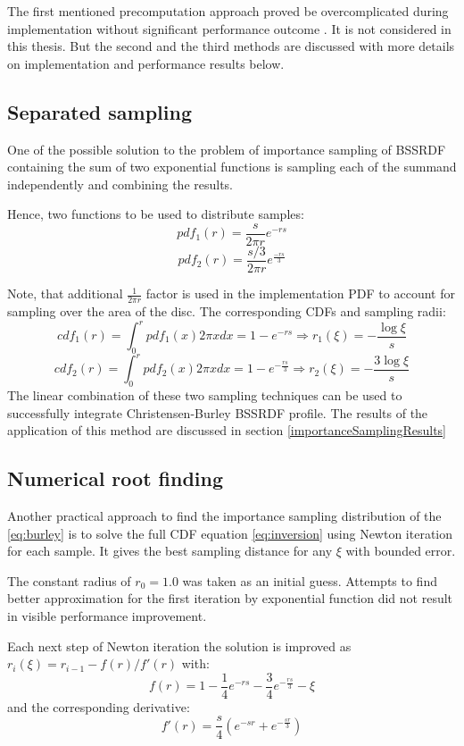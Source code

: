 The first mentioned precomputation approach proved be overcomplicated during implementation
without significant performance outcome \cite{Christensen:2015:ARP:2775280.2792555}. It is not
considered in this thesis. But the second and the third methods are discussed with more details
on implementation and performance results below.

\subsection{Separated sampling}
One of the possible solution to the problem of importance sampling of BSSRDF containing the sum of
two exponential functions is sampling each of the summand independently and combining the results.

Hence, two functions to be used to distribute samples:
\[
pdf_1(r)=\frac{s}{2\pi r}e^{-rs}
\]
\[
pdf_2(r)=\frac{s/3}{2\pi r}e^{\frac{-rs}{3}}
\]

Note, that additional $\frac{1}{2\pi r}$ factor is used in the implementation PDF to account for
sampling over the area of the disc. The corresponding \gls{CDF}s and sampling radii:
\[
cdf_1(r)=\int_{0}^{r} pdf_1(x) 2\pi xdx = 1-e^{-rs} \Rightarrow r_1(\xi)=-\frac{\log{\xi}}{s}
\]
\[
cdf_2(r)=\int_{0}^{r} pdf_2(x) 2\pi xdx = 1-e^{-\frac{rs}{3}} \Rightarrow
r_2(\xi)=-\frac{3\log{\xi}}{s}
\]
The linear combination of these two sampling techniques can be used to successfully integrate
Christensen-Burley BSSRDF profile. The results of the application of this method are discussed in
section \ref{importanceSamplingResults}

\subsection{Numerical root finding}
Another practical approach to find the importance sampling distribution of the \ref{eq:burley} is to
solve the full CDF equation \ref{eq:inversion} using Newton iteration for each sample. It gives
the best sampling distance for any $\xi$ with bounded error.

The constant radius of $r_0=1.0$ was taken as an initial guess. Attempts to find better
approximation for the first iteration by exponential function did not result in visible performance
improvement.

Each next step of Newton iteration the solution is improved as $r_i(\xi)=r_{i-1}-f(r)/f'(r)$ with:
\[
f(r) = 1 - \frac{1}{4}e^{-rs} - \frac{3}{4}e^{-\frac{rs}{3}} - \xi
\]
and the corresponding derivative:
\[
f'(r) = \frac{s}{4}(e^{-sr}+e^{-\frac{sr}{3}})
\]

